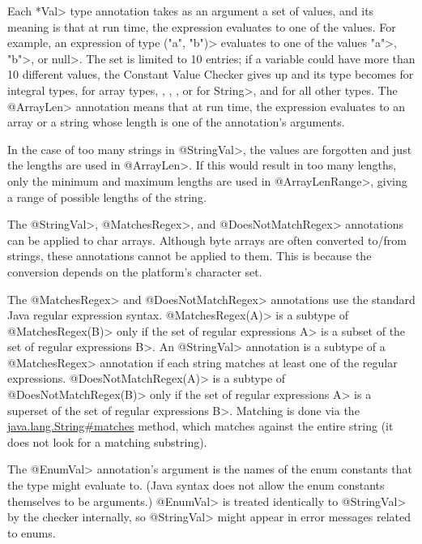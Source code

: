 Each \<*Val> type annotation takes as an argument a set of values, and its
meaning is that at run time, the expression evaluates to one of the values.  For
example, an expression of type
\<("a", "b")> evaluates to
one of the values \<"a">, \<"b">, or \<null>.
The set is limited to 10 entries; if a variable
could have more than 10 different values, the Constant Value
Checker gives up and its type becomes
 for integral types,
 for array types,
,
,
, or
 for \<String>, and
 for all other types.
The \<@ArrayLen> annotation means that at run time, the expression
evaluates to an array or a string whose length is one of the annotation's arguments.

In the case of too many strings in \<@StringVal>, the values are forgotten
and just the lengths are used in \<@ArrayLen>.
If this would result in too many lengths,
only the minimum and maximum lengths are used in \<@ArrayLenRange>,
giving a range of possible lengths of the string.

The \<@StringVal>, \<@MatchesRegex>, and \<@DoesNotMatchRegex>
annotations can be applied to char arrays.  Although byte
arrays are often converted to/from strings, these annotations cannot
be applied to them.  This is because the conversion depends on the
platform's character set.

The \<@MatchesRegex> and \<@DoesNotMatchRegex> annotations use the standard Java regular expression syntax.
\<@MatchesRegex(A)> is a subtype of \<@MatchesRegex(B)> only if the set of regular
expressions \<A> is a subset of the set of regular expressions \<B>. An
\<@StringVal> annotation is a subtype of a \<@MatchesRegex> annotation if
each string matches at least one of the regular expressions.
\<@DoesNotMatchRegex(A)> is a subtype of \<@DoesNotMatchRegex(B)> only if the set of regular
expressions \<A> is a superset of the set of regular expressions \<B>.
Matching is done
via the
\href{https://docs.oracle.com/en/java/javase/25/docs/api/java.base/java/lang/String.html\#matches(java.lang.String)}{java.lang.String\#matches}
method, which matches against the entire string (it does not look for a
matching substring).

The \<@EnumVal> annotation's argument is the names of the enum constants
that the type might evaluate to.  (Java syntax does not allow the enum
constants themselves to be arguments.)  \<@EnumVal>
is treated identically to \<@StringVal> by the checker internally, so
\<@StringVal> might appear in error messages related to enums.

